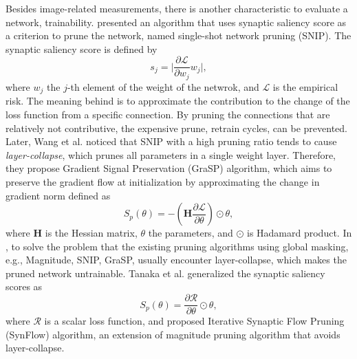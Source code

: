 \documentclass[sigconf]{acmart}
\begin{document}
    Besides image-related measurements, there is another characteristic to 
    evaluate a network, trainability. 
    \cite{lee2019snip} presented an algorithm that uses synaptic saliency score as a 
    criterion to prune the network, named single-shot network pruning (SNIP). 
    The synaptic saliency score is defined by 
    \begin{equation}
        \label{equ:snip_connection_sensitivity}
        s_j=\lvert \frac{\partial \mathcal L}{\partial w_j}w_j\rvert,
    \end{equation}
    where $w_j$ the $j$-th element of the weight of the netwrok, and $\mathcal L$ is 
    the empirical risk. The meaning behind is to approximate the contribution 
    to the change of the loss function from a specific connection. By pruning the 
    connections that are relatively not contributive, the expensive prune, retrain 
    cycles, can be prevented. 
    Later, Wang et al. \cite{wang2020picking} noticed that SNIP with a high pruning ratio 
    tends to cause \textit{layer-collapse}, which prunes all parameters in a single weight 
    layer. Therefore, they propose Gradient Signal Preservation (GraSP) algorithm, which 
    aims to preserve the gradient flow at initialization by approximating the change in 
    gradient norm defined as 
    \begin{equation}
        \label{equ:grap}
        S_p(\theta)=-(\textbf{H}\frac{\partial \mathcal L}{\partial \theta})\odot\theta,
    \end{equation}
    where $\textbf{H}$ is the Hessian matrix, $\theta$ the parameters, and $\odot$ is Hadamard product. 
    In \cite{tanaka2020pruning}, to solve the problem that the existing pruning algorithms using 
    global masking, e.g., Magnitude, SNIP, GraSP, usually encounter layer-collapse, which makes 
    the pruned network untrainable. 
    Tanaka et al. generalized the synaptic saliency scores as 
    \begin{equation}
        \label{equ:synflow}
        S_p(\theta)=\frac{\partial \mathcal R}{\partial \theta}\odot\theta,
    \end{equation}
    where $\mathcal R$ is a scalar loss function, and proposed Iterative Synaptic Flow Pruning (SynFlow) 
    algorithm, an extension of magnitude pruning algorithm that avoids layer-collapse. 
\end{document}
